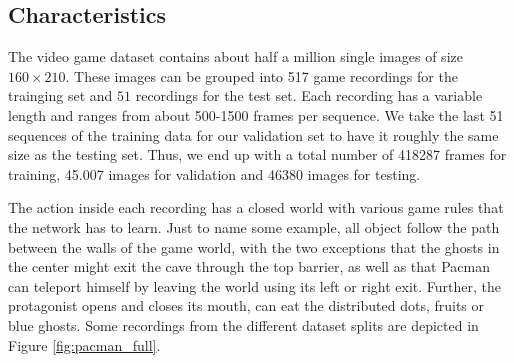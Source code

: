 \subsection{Characteristics}

The video game dataset contains about half a million single images of size $ 160 \times 210 $. These images can be grouped into \num{517} game recordings for the trainging set and $51$ recordings for the test set. Each recording has a variable length and ranges from about \num{500}-\num{1500} frames per sequence. We take the last \num{51} sequences of the training data for our validation set to have it roughly the same size as the testing set. Thus, we end up with a total number of \num{418287} frames for training, \num{45,007} images for validation and \num{46380} images for testing.

The action inside each recording has a closed world with various game rules that the network has to learn. Just to name some example, all object follow the path between the walls of the game world, with the two exceptions that the ghosts in the center might exit the cave through the top barrier, as well as that Pacman can teleport himself by leaving the world using its left or right exit. Further, the protagonist opens and closes its mouth, can eat the distributed dots, fruits or blue ghosts. Some recordings from the different dataset splits are depicted in Figure \ref{fig:pacman_full}.

